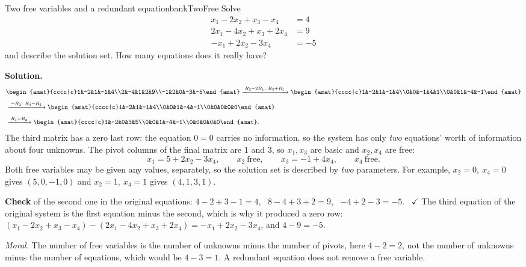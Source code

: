 \documentclass[11pt]{article}
\begin{document}
\begin{exmp}{Two free variables and a redundant equation}{bankTwoFree}
Solve
\[
\begin{aligned}
x_1-2x_2+x_3-x_4&=4\\
2x_1-4x_2+x_3+2x_4&=9\\
-x_1+2x_2-3x_4&=-5
\end{aligned}
\]
and describe the solution set. How many equations does it really have?

\textbf{Solution.}
\begin{align*}
&\begin{amat}{cccc|c}1&-2&1&-1&4\\2&-4&1&2&9\\-1&2&0&-3&-5\end{amat}
\rops{R_2-2R_1,\ R_3+R_1}
\begin{amat}{cccc|c}1&-2&1&-1&4\\0&0&-1&4&1\\0&0&1&-4&-1\end{amat}\\[4pt]
&
\rops{-R_2,\ R_3-R_2}
\begin{amat}{cccc|c}1&-2&1&-1&4\\0&0&1&-4&-1\\0&0&0&0&0\end{amat}\\[4pt]
&
\rops{R_1-R_2}
\begin{amat}{cccc|c}1&-2&0&3&5\\0&0&1&-4&-1\\0&0&0&0&0\end{amat}.
\end{align*}
The third matrix has a zero last row: the equation $0=0$ carries no information, so the system has only \emph{two} equations' worth of information about four unknowns. The pivot columns of the final matrix are $1$ and $3$, so $x_1,x_3$ are basic and $x_2,x_4$ are free:
\[
x_1=5+2x_2-3x_4,\qquad x_2\ \text{free},\qquad x_3=-1+4x_4,\qquad x_4\ \text{free}.
\]
Both free variables may be given any values, separately, so the solution set is described by \emph{two} parameters. For example, $x_2=0,\ x_4=0$ gives $(5,0,-1,0)$ and $x_2=1,\ x_4=1$ gives $(4,1,3,1)$.

\textbf{Check} of the second one in the original equations: $4-2+3-1=4$, \ $8-4+3+2=9$, \ $-4+2-3=-5$. \ $\checkmark$ The third equation of the original system is the first equation minus the second, which is why it produced a zero row: $(x_1-2x_2+x_3-x_4)-(2x_1-4x_2+x_3+2x_4)=-x_1+2x_2-3x_4$, and $4-9=-5$.

\emph{Moral.} The number of free variables is the number of unknowns minus the number of pivots, here $4-2=2$, not the number of unknowns minus the number of equations, which would be $4-3=1$. A redundant equation does not remove a free variable.
\end{exmp}
\end{document}
